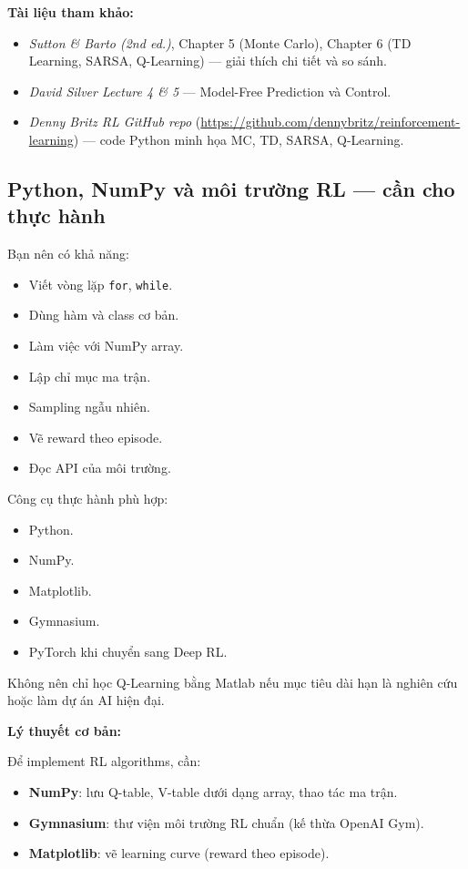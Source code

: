 \documentclass[12pt,a4paper]{article}
\begin{document}
\textbf{Tài liệu tham khảo:}
\begin{itemize}[leftmargin=1.5em]
    \item \textit{Sutton \& Barto (2nd ed.)}, Chapter 5 (Monte Carlo), Chapter 6 (TD Learning, SARSA, Q-Learning) --- giải thích chi tiết và so sánh.
    \item \textit{David Silver Lecture 4 \& 5} --- Model-Free Prediction và Control.
    \item \textit{Denny Britz RL GitHub repo} (\url{https://github.com/dennybritz/reinforcement-learning}) --- code Python minh họa MC, TD, SARSA, Q-Learning.
\end{itemize}

\subsection{Python, NumPy và môi trường RL --- cần cho thực hành}

Bạn nên có khả năng:

\begin{itemize}[leftmargin=1.5em]
    \item Viết vòng lặp \texttt{for}, \texttt{while}.
    \item Dùng hàm và class cơ bản.
    \item Làm việc với NumPy array.
    \item Lập chỉ mục ma trận.
    \item Sampling ngẫu nhiên.
    \item Vẽ reward theo episode.
    \item Đọc API của môi trường.
\end{itemize}

Công cụ thực hành phù hợp:

\begin{itemize}[leftmargin=1.5em]
    \item Python.
    \item NumPy.
    \item Matplotlib.
    \item Gymnasium.
    \item PyTorch khi chuyển sang Deep RL.
\end{itemize}

Không nên chỉ học Q-Learning bằng Matlab nếu mục tiêu dài hạn là nghiên cứu hoặc làm dự án AI hiện đại.

\textbf{Lý thuyết cơ bản:}

Để implement RL algorithms, cần:
\begin{itemize}[leftmargin=1.5em]
    \item \textbf{NumPy}: lưu Q-table, V-table dưới dạng array, thao tác ma trận.
    \item \textbf{Gymnasium}: thư viện môi trường RL chuẩn (kế thừa OpenAI Gym).
    \item \textbf{Matplotlib}: vẽ learning curve (reward theo episode).
\end{itemize}
\end{document}
